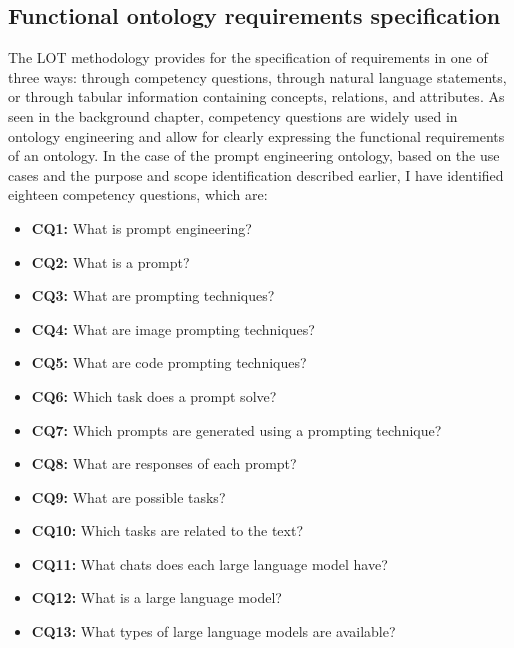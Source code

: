 \subsection{Functional ontology requirements specification}
The LOT methodology provides for the specification of requirements in one of three ways: through competency questions, through natural language statements, or through tabular information containing concepts, relations, and attributes. As seen in the background chapter, competency questions are widely used in ontology engineering and allow for clearly expressing the functional requirements of an ontology. In the case of the prompt engineering ontology, based on the use cases and the purpose and scope identification described earlier, I have identified eighteen competency questions, which are:
\begin{itemize}
    \item \textbf{CQ1:} What is prompt engineering?

    \item \textbf{CQ2:} What is a prompt?

    \item \textbf{CQ3:} What are prompting techniques?

    \item \textbf{CQ4:} What are image prompting techniques?

    \item \textbf{CQ5:} What are code prompting techniques?

    \item \textbf{CQ6:} Which task does a prompt solve?

    \item \textbf{CQ7:} Which prompts are generated using a prompting technique?

    \item \textbf{CQ8:} What are responses of each prompt?

    \item \textbf{CQ9:} What are possible tasks?

    \item \textbf{CQ10:} Which tasks are related to the text?

    \item \textbf{CQ11:} What chats does each large language model have?

    \item \textbf{CQ12:} What is a large language model?

    \item \textbf{CQ13:} What types of large language models are available?


\end{itemize}
